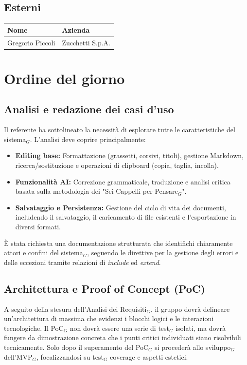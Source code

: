 \documentclass[a4paper, 10pt, colorlinks=true, linkcolor=black, urlcolor=blue, citecolor=blue, hidelinks]{article}
\begin{document}
\subsection{Esterni}
\begin{center}
\begin{tabular}{|l|l|}
\hline
\textbf{Nome} & \textbf{Azienda} \\
\hline
Gregorio Piccoli & Zucchetti S.p.A. \\
\hline
\end{tabular}
\end{center}

\section{Ordine del giorno}

\subsection{Analisi e redazione dei casi d'uso}
Il referente ha sottolineato la necessità di esplorare tutte le caratteristiche del sistema$_G$. L'analisi deve coprire principalmente:
\begin{itemize}
    \item \textbf{Editing base:} Formattazione (grassetti, corsivi, titoli), gestione Markdown, ricerca/sostituzione e operazioni di clipboard (copia, taglia, incolla).
    \item \textbf{Funzionalità AI:} Correzione grammaticale, traduzione e analisi critica basata sulla metodologia dei "Sei Cappelli per Pensare$_G$".
    \item \textbf{Salvataggio e Persistenza:} Gestione del ciclo di vita dei documenti, includendo il salvataggio, il caricamento di file esistenti e l'esportazione in diversi formati.
\end{itemize}
È stata richiesta una documentazione strutturata che identifichi chiaramente attori e confini del sistema$_G$, seguendo le direttive per la gestione degli errori e delle eccezioni tramite relazioni di \textit{include} ed \textit{extend}.

\subsection{Architettura e Proof of Concept (PoC)}
A seguito della stesura dell'Analisi dei Requisiti$_G$, il gruppo dovrà delineare un'architettura di massima che evidenzi i blocchi logici e le interazioni tecnologiche. Il PoC$_G$ non dovrà essere una serie di test$_G$ isolati, ma dovrà fungere da dimostrazione concreta che i punti critici individuati siano risolvibili tecnicamente. Solo dopo il superamento del PoC$_G$ si procederà allo sviluppo$_G$ dell'MVP$_G$, focalizzandosi su test$_G$ coverage e aspetti estetici.
\end{document}
